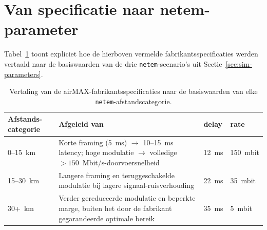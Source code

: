 \section{Van specificatie naar netem-parameter}%
\label{sec:app-airmax-vertaling}

Tabel~\ref{tab:app-airmax-vertaling} toont expliciet hoe de hierboven vermelde
fabrikantsspecificaties werden vertaald naar de basiswaarden van de drie
\texttt{netem}-scenario's uit Sectie~\ref{sec:sim-parameters}.

\begin{table}[h]
  \centering
  \small
  \begin{tabular}{p{2.6cm}p{4.2cm}p{2.2cm}p{2.2cm}}
    \toprule
    \textbf{Afstands-categorie} & \textbf{Afgeleid van} & \textbf{delay} & \textbf{rate} \\
    \midrule
    0--15~km & Korte framing (5~ms) $\to$ 10--15~ms latency; hoge modulatie $\to$
      volledige $>150$~Mbit/s-doorvoersnelheid & 12~ms & 150~mbit \\
    15--30~km & Langere framing en teruggeschakelde modulatie bij lagere
      signaal-ruisverhouding & 22~ms & 35~mbit \\
    30+~km & Verder gereduceerde modulatie en beperkte marge, buiten het door de
      fabrikant gegarandeerde optimale bereik & 35~ms & 5~mbit \\
    \bottomrule
  \end{tabular}
  \caption{Vertaling van de airMAX-fabrikantsspecificaties naar de basiswaarden van elke
  \texttt{netem}-afstandscategorie.}
  \label{tab:app-airmax-vertaling}
\end{table}